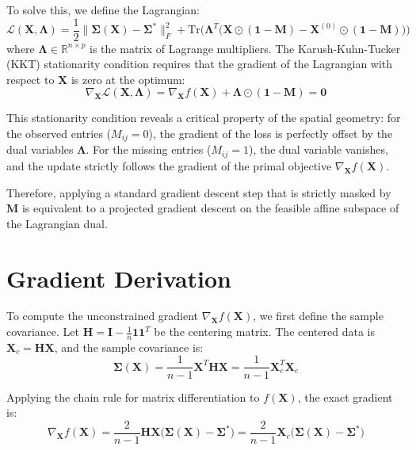 \documentclass[11pt]{article}
\begin{document}
To solve this, we define the Lagrangian:
\begin{equation}
    \mathcal{L}(\bm{X}, \bm{\Lambda}) = \frac{1}{2} \big\| \bm{\Sigma}(\bm{X}) - \bm{\Sigma}^* \big\|_F^2 + \text{Tr}\Big( \bm{\Lambda}^T \big( \bm{X} \odot (\bm{1} - \bm{M}) - \bm{X}^{(0)} \odot (\bm{1} - \bm{M}) \big) \Big)
\end{equation}
where $\bm{\Lambda} \in \mathbb{R}^{n \times p}$ is the matrix of Lagrange multipliers. The Karush-Kuhn-Tucker (KKT) stationarity condition requires that the gradient of the Lagrangian with respect to $\bm{X}$ is zero at the optimum:
\begin{equation}
    \nabla_{\bm{X}} \mathcal{L}(\bm{X}, \bm{\Lambda}) = \nabla_{\bm{X}} f(\bm{X}) + \bm{\Lambda} \odot (\bm{1} - \bm{M}) = \mathbf{0}
\end{equation}

This stationarity condition reveals a critical property of the spatial geometry: for the observed entries ($M_{ij} = 0$), the gradient of the loss is perfectly offset by the dual variables $\bm{\Lambda}$. For the missing entries ($M_{ij} = 1$), the dual variable vanishes, and the update strictly follows the gradient of the primal objective $\nabla_{\bm{X}} f(\bm{X})$. 

Therefore, applying a standard gradient descent step that is strictly masked by $\bm{M}$ is equivalent to a projected gradient descent on the feasible affine subspace of the Lagrangian dual.

\section{Gradient Derivation}
To compute the unconstrained gradient $\nabla_{\bm{X}} f(\bm{X})$, we first define the sample covariance. Let $\bm{H} = \bm{I} - \frac{1}{n}\bm{1}\bm{1}^T$ be the centering matrix. The centered data is $\bm{X}_c = \bm{H}\bm{X}$, and the sample covariance is:
\begin{equation}
    \bm{\Sigma}(\bm{X}) = \frac{1}{n-1} \bm{X}^T \bm{H} \bm{X} = \frac{1}{n-1} \bm{X}_c^T \bm{X}_c
\end{equation}

Applying the chain rule for matrix differentiation to $f(\bm{X})$, the exact gradient is:
\begin{equation}
    \nabla_{\bm{X}} f(\bm{X}) = \frac{2}{n-1} \bm{H} \bm{X} \big( \bm{\Sigma}(\bm{X}) - \bm{\Sigma}^* \big) = \frac{2}{n-1} \bm{X}_c \big( \bm{\Sigma}(\bm{X}) - \bm{\Sigma}^* \big)
\end{equation}
\end{document}
